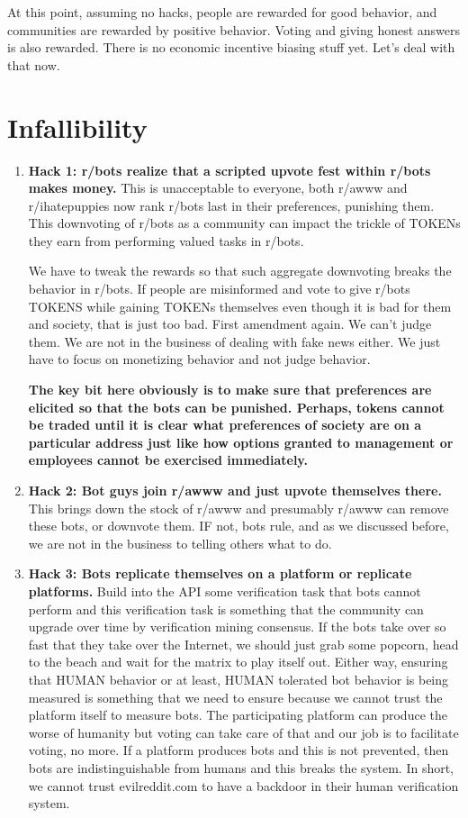 At this point, assuming no hacks, people are rewarded for good behavior, and communities are rewarded by positive behavior. Voting and giving honest answers is also rewarded. There is no economic incentive biasing stuff yet. Let's deal with that now.

\section*{Infallibility}
\begin{enumerate}
	\item \textbf{Hack 1: r/bots realize that a scripted upvote fest within r/bots makes money.} This is unacceptable to everyone, both r/awww and r/ihatepuppies now rank r/bots last in their preferences, punishing them. This downvoting of r/bots as a community can impact the trickle of TOKENs they earn from performing valued tasks in r/bots. 
	
	We have to tweak the rewards so that such aggregate downvoting breaks the behavior in r/bots. If people are misinformed and vote to give r/bots TOKENS while gaining TOKENs themselves even though it is bad for them and society, that is just too bad. First amendment again. We can't judge them. We are not in the business of dealing with fake news either. We just have to focus on monetizing behavior and not judge behavior.
	
	\textbf{The key bit here obviously is to make sure that preferences are elicited so that the bots can be punished. Perhaps, tokens cannot be traded until it is clear what preferences of society are on a particular address just like how options granted to management or employees cannot be exercised immediately.}
	
	\item \textbf{Hack 2: Bot guys join r/awww and just upvote themselves there.} This brings down the stock of r/awww and presumably r/awww can remove these bots, or downvote them. IF not, bots rule, and as we discussed before, we are not in the business to telling others what to do. 
	
	\item \textbf{Hack 3: Bots replicate themselves on a platform or replicate platforms.} Build into the API some verification task that bots cannot perform and this verification task is something that the community can upgrade over time by verification mining consensus. If the bots take over so fast that they take over the Internet, we should just grab some popcorn, head to the beach and wait for the matrix to play itself out. Either way, ensuring that HUMAN behavior or at least, HUMAN tolerated bot behavior is being measured is something that we need to ensure because we cannot trust the platform itself to measure bots. The participating platform can produce the worse of humanity but voting can take care of that and our job is to facilitate voting, no more. If a platform produces bots and this is not prevented, then bots are indistinguishable from humans and this breaks the system. In short, we cannot trust evilreddit.com to have a backdoor in their human verification system.
	
\end{enumerate}    


